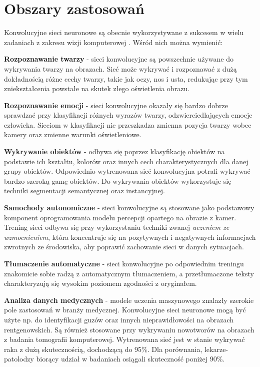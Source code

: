\section{Obszary zastosowań}
Konwolucyjne sieci neuronowe są obecnie wykorzystywane z sukcesem w wielu zadaniach z zakresu wizji komputerowej \cite{kumar:cnnApplications}. Wśród nich można wymienić:
\begin{enumerate*}
\item \textbf{Rozpoznawanie twarzy} - sieci konwolucyjne są powszechnie używane do wykrywania twarzy na obrazach. Sieć może wykrywać i rozpoznawać z dużą dokładnością różne cechy twarzy, takie jak oczy, nos i usta, redukując przy tym zniekształcenia powstałe na skutek złego oświetlenia obrazu.
\item \textbf{Rozpoznawanie emocji} - sieci konwolucyjne okazały się bardzo dobrze sprawdzać przy klasyfikacji różnych wyrazów twarzy, odzwierciedlających emocje człowieka. Sieciom w klasyfikacji nie przeszkadza zmienna pozycja twarzy wobec kamery oraz zmienne warunki oświetleniowe.
\item \textbf{Wykrywanie obiektów} - odbywa się poprzez klasyfikację obiektów na podstawie ich kształtu, kolorów oraz innych cech charakterystycznych dla danej grupy obiektów. Odpowiednio wytrenowana sieć konwolucyjna potrafi wykrywać bardzo szeroką gamę obiektów. Do wykrywania obiektów wykorzystuje się techniki segmentacji semantycznej oraz instancyjnej.
\item \textbf{Samochody autonomiczne} - sieci konwolucyjne są stosowane jako podstawowy komponent oprogramowania modelu percepcji opartego na obrazie z kamer. Trening sieci odbywa się przy wykorzystaniu techniki zwanej \textit{uczeniem ze wzmocnieniem}, która koncentruje się na pozytywnych i negatywnych informacjach zwrotnych ze środowiska, aby poprawić zachowanie sieci w danych sytuacjach.
\item \textbf{Tłumaczenie automatyczne} - sieci konwolucyjne po odpowiednim treningu znakomicie sobie radzą z automatycznym tłumaczeniem, a przetłumaczone teksty charakteryzują się wysokim poziomem zgodności z oryginałem.
\item \textbf{Analiza danych medycznych} - modele uczenia maszynowego znalazły szerokie pole zastosowań w branży medycznej. Konwolucyjne sieci neuronowe mogą być użyte np. do identyfikacji guzów oraz innych nieprawidłowości na obrazach rentgenowskich. Są również stosowane przy wykrywaniu nowotworów na obrazach z badania tomografii komputerowej. Wytrenowana sieć jest w stanie wykrywać raka z dużą skutecznością, dochodzącą do 95\%. Dla porównania, lekarze-patolodzy biorący udział w badaniach osiągali skuteczność poniżej 90\%.

\end{enumerate*}
